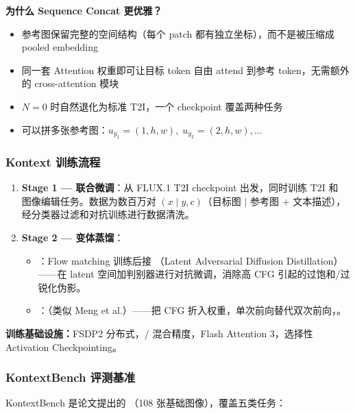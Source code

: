 \textbf{为什么 Sequence Concat 更优雅？}
\begin{itemize}[leftmargin=1.5em]
  \item 参考图保留完整的空间结构（每个 patch 都有独立坐标），而不是被压缩成 pooled embedding
  \item 同一套 Attention 权重即可让目标 token 自由 attend 到参考 token，无需额外的 cross-attention 模块
  \item $N=0$ 时自然退化为标准 T2I，一个 checkpoint 覆盖两种任务
  \item 可以拼多张参考图：$u_{y_1}=(1,h,w),\; u_{y_2}=(2,h,w),\ldots$
\end{itemize}

\subsubsection{Kontext 训练流程}

\begin{enumerate}[leftmargin=1.5em]
  \item \textbf{Stage 1 — 联合微调}：从 FLUX.1 T2I checkpoint 出发，同时训练 T2I 和 图像编辑任务。数据为数百万对 $(x \mid y, c)$（目标图 $\mid$ 参考图 $+$ 文本描述），经分类器过滤和对抗训练进行数据清洗。
  \item \textbf{Stage 2 — 变体蒸馏}：
    \begin{itemize}
      \item \code{[pro]}：Flow matching 训练后接 （Latent Adversarial Diffusion Distillation）——在 latent 空间加判别器进行对抗微调，消除高 CFG 引起的过饱和/过锐化伪影。
      \item \code{[dev]}：（类似 Meng et al.）——把 CFG 折入权重，单次前向替代双次前向，。
    \end{itemize}
\end{enumerate}

\textbf{训练基础设施：}FSDP2 分布式，/ 混合精度，Flash Attention 3，选择性 Activation Checkpointing。

\subsubsection{KontextBench 评测基准}

\begin{conceptbox}
KontextBench 是论文提出的 （108 张基础图像），覆盖五类任务：
\end{conceptbox}

